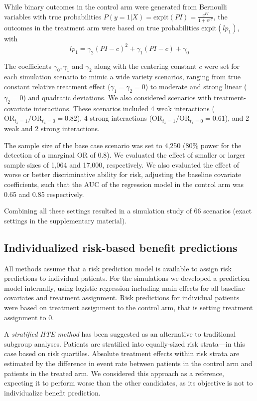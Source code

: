 \documentclass{article}
\begin{document}
While binary outcomes in the control arm were generated from Bernoulli
variables with true probabilities
\(P(y=1|X) = \text{expit}(PI)=\frac{e^{PI}}{1+e^{PI}}\), the outcomes in
the treatment arm were based on true probabilities
\(\text{expit}(lp_1)\), with
\[lp_1 = \gamma_2(PI-c)^2 + \gamma_1(PI-c) + \gamma_0\]

The coefficients \(\gamma_0,\gamma_1\) and \(\gamma_2\) along with the
centering constant \(c\) were set for each simulation scenario to mimic
a wide variety scenarios, ranging from true constant relative treatment
effect (\(\gamma_1=\gamma_2=0\)) to moderate and strong linear
(\(\gamma_2=0\)) and quadratic deviations. We also considered scenarios
with treatment-covariate interactions. These scenarios included 4 weak
interactions (\(\text{OR}_{t_x=1} / \text{OR}_{t_x=0}=0.82\)), 4 strong
interactions (\(\text{OR}_{t_x=1} / \text{OR}_{t_x=0}=0.61\)), and 2
weak and 2 strong interactions.

The sample size of the base case scenario was set to 4,250 (\(80\%\)
power for the detection of a marginal OR of 0.8). We evaluated the
effect of smaller or larger sample sizes of 1,064 and 17,000,
respectively. We also evaluated the effect of worse or better
discriminative ability for risk, adjusting the baseline covariate
coefficients, such that the AUC of the regression model in the control
arm was 0.65 and 0.85 respectively.

Combining all these settings resulted in a simulation study of 66
scenarios (exact settings in the supplementary material).

\hypertarget{individualized-risk-based-benefit-predictions}{%
\subsection{Individualized risk-based benefit
predictions}\label{individualized-risk-based-benefit-predictions}}

All methods assume that a risk prediction model is available to assign
risk predictions to individual patients. For the simulations we
developed a prediction model internally, using logistic regression
including main effects for all baseline covariates and treatment
assignment. Risk predictions for individual patients were based on
treatment assignment to the control arm, that is setting treatment
assignment to 0.

A \emph{stratified HTE method} has been suggested as an alternative to
traditional subgroup analyses. Patients are stratified into
equally-sized risk strata---in this case based on risk quartiles.
Absolute treatment effects within risk strata are estimated by the
difference in event rate between patients in the control arm and
patients in the treated arm. We considered this approach as a reference,
expecting it to perform worse than the other candidates, as its
objective is not to individualize benefit prediction.
\end{document}
